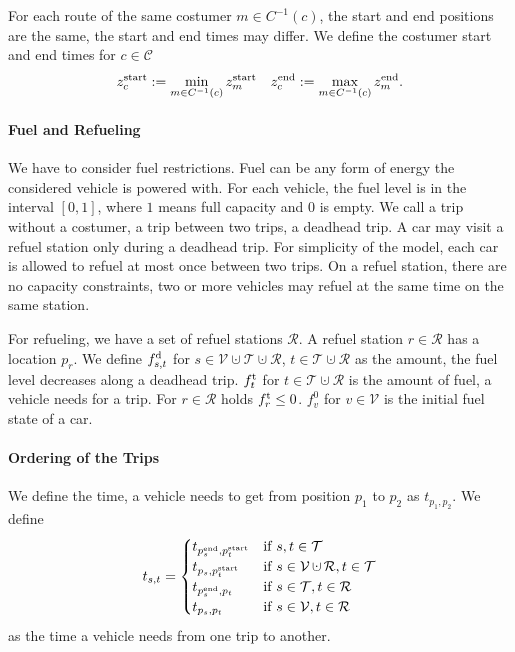 For each route of the same costumer $m\in C^{-1}(c)$, the start and end positions are the same, the start and end times may differ. We define the costumer start and end times for $c\in\mathcal{C}$
\begin{align*}
	z^{\operatorname{start}}_c := \min_{m\in C^{-1}(c)}z^{\operatorname{start}}_m & & z^{\operatorname{end}}_c := \max_{m\in C^{-1}(c)}z^{\operatorname{end}}_m .
\end{align*}

\paragraph{Fuel and Refueling} \parfill

We have to consider fuel restrictions. Fuel can be any form of energy the considered vehicle is powered with. For each vehicle, the fuel level is in the interval $[0,1]$, where $1$ means full capacity and $0$ is empty. We call a trip without a costumer, \ie a trip between two trips, a deadhead trip. A car may visit a refuel station only during a deadhead trip. For simplicity of the model, each car is allowed to refuel at most once between two trips. On a refuel station, there are no capacity constraints, \ie two or more vehicles may refuel at the same time on the same station.

For refueling, we have a set of refuel stations $\mathcal{R}$. A refuel station $r\in\mathcal{R}$ has a location $p_r$. We define $f^{\operatorname{d}}_{s,t}$ for $s\in\mathcal{V}\cupdot\mathcal{T}\cupdot\mathcal{R}$, $t\in\mathcal{T}\cupdot\mathcal{R}$ as the amount, the fuel level decreases along a deadhead trip. $f^{\operatorname{t}}_t$ for $t\in\mathcal{T}\cupdot\mathcal{R}$ is the amount of fuel, a vehicle needs for a trip. For $r\in\mathcal{R}$ holds $f^{\operatorname{t}}_r \leq 0$. $f^0_v$ for $v\in\mathcal{V}$ is the initial fuel state of a car.

\paragraph{Ordering of the Trips} \parfill

We define the time, a vehicle needs to get from position $p_1$ to $p_2$ as $t_{p_1,p_2}$. We define
\begin{equation*}
	t_{s,t} = 
	\begin{cases}
		t_{\pend_s,\pstart_t} & \text{if } s,t\in\mathcal{T} \\
		t_{p_s,\pstart_t} & \text{if } s\in\mathcal{V}\cupdot\mathcal{R}, t\in\mathcal{T} \\
		t_{\pend_s,p_t} & \text{if } s\in\mathcal{T}, t\in\mathcal{R} \\
		t_{p_s,p_t} & \text{if } s\in\mathcal{V},t\in\mathcal{R}
	\end{cases}
\end{equation*}
as the time a vehicle needs from one trip to another.

